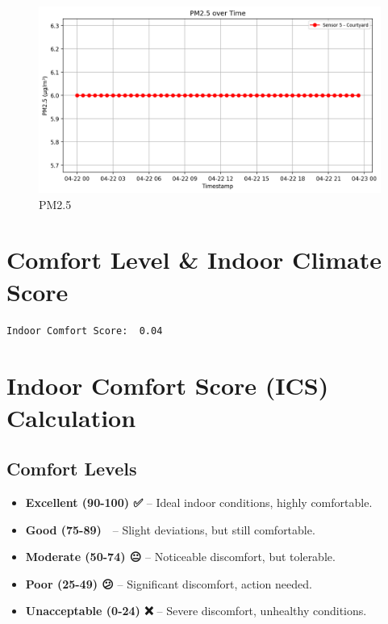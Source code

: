 \documentclass[
  12pt,
  letterpaper,
]{article}
\providecommand{\tightlist}{%
  \setlength{\itemsep}{0pt}\setlength{\parskip}{0pt}}\usepackage{longtable,booktabs,array}
\begin{document}
\begin{figure}[H]

{\centering \includegraphics[width=0.85\linewidth,height=\textheight,keepaspectratio]{./charts/pm_chart.png}

}

\caption{PM2.5}

\end{figure}%

\section{Comfort Level \& Indoor Climate
Score}\label{comfort-level-indoor-climate-score}

\begin{verbatim}
Indoor Comfort Score:  0.04
\end{verbatim}

\section{\texorpdfstring{\textbf{Indoor Comfort Score (ICS)
Calculation}}{Indoor Comfort Score (ICS) Calculation}}\label{indoor-comfort-score-ics-calculation}

\subsection{\texorpdfstring{\textbf{Comfort
Levels}}{Comfort Levels}}\label{comfort-levels}

\begin{itemize}
\tightlist
\item
  \textbf{Excellent (90-100) ✅} -- Ideal indoor conditions, highly
  comfortable.\\
\item
  \textbf{Good (75-89) 🙂} -- Slight deviations, but still
  comfortable.\\
\item
  \textbf{Moderate (50-74) 😐} -- Noticeable discomfort, but
  tolerable.\\
\item
  \textbf{Poor (25-49) 😕} -- Significant discomfort, action needed.\\
\item
  \textbf{Unacceptable (0-24) ❌} -- Severe discomfort, unhealthy
  conditions.
\end{itemize}
\end{document}
